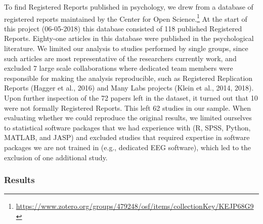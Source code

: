 \documentclass[,jou, a4paper,floatsintext]{apa6}
\let\rmarkdownfootnote\footnote%
\def\footnote{\protect\rmarkdownfootnote}
\begin{document}
To find Registered Reports published in psychology, we drew from a database of registered reports maintained by the Center for Open Science.\footnote{\url{https://www.zotero.org/groups/479248/osf/items/collectionKey/KEJP68G9}} At the start of this project (06-05-2018) this database consisted of 118 published Registered Reports. Eighty-one articles in this database were published in the psychological literature. We limited our analysis to studies performed by single groups, since such articles are most representative of the researchers currently work, and excluded 7 large scale collaborations where dedicated team members were responsible for making the analysis reproducible, such as Registered Replication Reports (Hagger et al., 2016) and Many Labs projects (Klein et al., 2014, 2018). Upon further inspection of the 72 papers left in the dataset, it turned out that 10 were not formally Registered Reports. This left 62 studies in our sample. When evaluating whether we could reproduce the original results, we limited ourselves to statistical software packages that we had experience with (R, SPSS, Python, MATLAB, and JASP) and excluded studies that required expertise in software packages we are not trained in (e.g., dedicated EEG software), which led to the exclusion of one additional study.

\hypertarget{results}{%
\subsubsection{Results}\label{results}}
\end{document}
